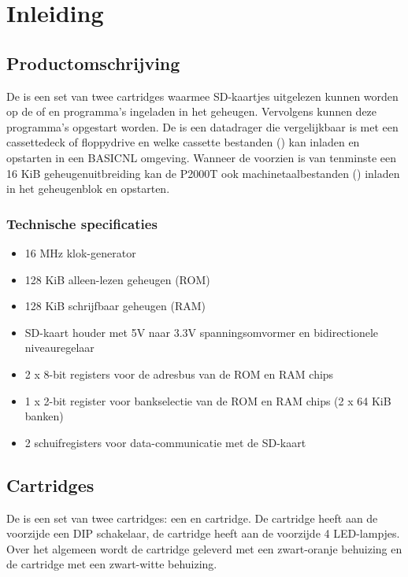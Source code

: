 \chapter{Inleiding}
\chapterpreamble

%
%
%
\section{Productomschrijving}

De \product is een set van twee cartridges waarmee SD-kaartjes uitgelezen kunnen worden op de  of  en programma's ingeladen in het geheugen. Vervolgens kunnen deze programma's opgestart worden. De \product is een datadrager die vergelijkbaar is met een cassettedeck of floppydrive en welke cassette bestanden (\cas) kan inladen en opstarten in een BASICNL omgeving. Wanneer de  voorzien is van tenminste een 16 KiB geheugenuitbreiding kan de P2000T ook machinetaalbestanden (\prg) inladen in het geheugenblok  en opstarten.

%
%
\subsection{Technische specificaties}

\begin{itemize}[noitemsep]
    \item 16 MHz klok-generator
    \item 128 KiB alleen-lezen geheugen (ROM)
    \item 128 KiB schrijfbaar geheugen (RAM)
    \item SD-kaart houder met 5V naar 3.3V spanningsomvormer en bidirectionele niveauregelaar
    \item 2 x 8-bit registers voor de adresbus van de ROM en RAM chips
    \item 1 x 2-bit register voor bankselectie van de ROM en RAM chips (2 x 64 KiB banken)
    \item 2 schuifregisters voor data-communicatie met de SD-kaart
\end{itemize}

%
%
%
\section{Cartridges}

De \product is een set van twee cartridges: een  en  cartridge. De  cartridge heeft aan de voorzijde een DIP schakelaar, de  cartridge heeft aan de voorzijde 4 LED-lampjes. Over het algemeen wordt de  cartridge geleverd met een zwart-oranje behuizing en de  cartridge met een zwart-witte behuizing.


